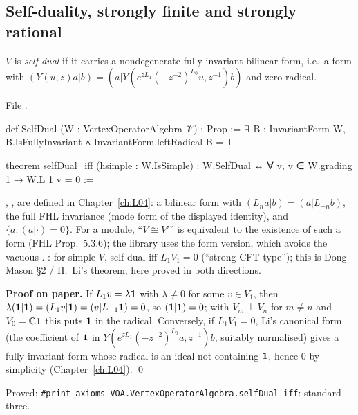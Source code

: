 \subsection{Self-duality, strongly finite and strongly rational}\label{l12:sec:strong}

\begin{definition}\label{l12:def:selfdual}
$V$ is \emph{self-dual} if it carries a nondegenerate fully invariant bilinear form, i.e.\ a form with
$(Y(u,z)a|b) = (a|Y(e^{zL_1}(-z^{-2})^{L_0}u,z^{-1})b)$ and zero radical.
\end{definition}
\noindent File .
\begin{leancode}
def SelfDual (W : VertexOperatorAlgebra 𝒱) : Prop :=
  ∃ B : InvariantForm W, B.IsFullyInvariant ∧ InvariantForm.leftRadical B = ⊥

theorem selfDual_iff (hsimple : W.IsSimple) :
    W.SelfDual ↔ ∀ v, v ∈ W.grading 1 → W.L 1 v = 0 :=
\end{leancode}

\begin{dictionary}
, ,  are defined in Chapter~\ref{ch:L04}: a bilinear form with
$(L_na|b) = (a|L_{-n}b)$, the full FHL invariance (mode form of the displayed identity), and $\{a : (a|\cdot) = 0\}$. For a
module, ``$V\cong V'$'' is equivalent to the existence of such a form (FHL Prop.~5.3.6); the library uses the form version,
which avoids the vacuous . : for simple $V$, self-dual iff $L_1V_1 = 0$
(``strong CFT type''); this is Dong--Mason §2 / H.~Li's theorem, here proved in both directions.
\end{dictionary}

\textbf{Proof on paper.} If $L_1v = \lambda\mathbf{1}$ with $\lambda\neq0$ for some $v\in V_1$, then
$\lambda(\mathbf{1}|\mathbf{1}) = (L_1v|\mathbf{1}) = (v|L_{-1}\mathbf{1}) = 0$, so $(\mathbf{1}|\mathbf{1}) = 0$; with $V_m\perp V_n$ for
$m\neq n$ and $V_0 = {\mathbb{C}}\mathbf{1}$ this puts $\mathbf{1}$ in the radical. Conversely, if $L_1V_1 = 0$, Li's canonical form (the coefficient of
$\mathbf{1}$ in $Y(e^{zL_1}(-z^{-2})^{L_0}a,z^{-1})b$, suitably normalised) gives a fully invariant form whose radical is an ideal not containing $\mathbf{1}$,
hence $0$ by simplicity (Chapter~\ref{ch:L04}). \qed

\begin{status}
Proved; \texttt{\#print axioms VOA.VertexOperatorAlgebra.selfDual\_iff}: standard three.
\end{status}

